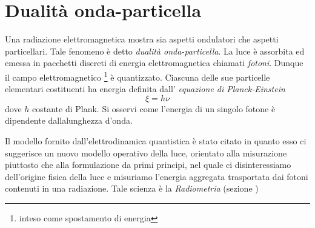 \begin{figure}[t]
	\label{chapter1:EMwave}
\end{figure}
%
\section{Dualit\`a onda-particella}
Una radiazione elettromagnetica mostra sia aspetti ondulatori che aspetti particellari. Tale fenomeno \`e detto \textit{dualit\`a onda-particella}.
La luce \`e assorbita ed emessa in pacchetti discreti di energia elettromagnetica chiamati \textit{fotoni}. Dunque il campo elettromagnetico
\footnote{inteso come spostamento di energia} \`e quantizzato. Ciascuna delle sue particelle elementari costituenti ha energia definita dall'
\textit{equazione di Planck-Einstein} 
\label{chapter1:plankEinstein}
\[\xi = h\nu\] 
dove $h$ costante di Plank. Si osservi come l'energia di un singolo fotone \`e dipendente dallalunghezza d'onda.\par

Il modello fornito dall'elettrodinamica quantistica \`e stato citato in quanto esso ci suggerisce un nuovo modello operativo della luce, orientato 
alla misurazione piuttosto che alla formulazione da primi principi, nel quale ci disinteressiamo dell'origine fisica della luce e misuriamo
l'energia aggregata trasportata dai fotoni contenuti in una radiazione. Tale scienza \`e la \textit{Radiometria} (sezione )\par

